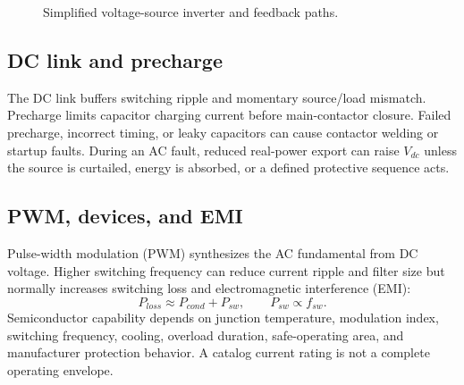 \documentclass[11pt]{article}
\begin{document}
\begin{figure}[h]
\centering
{}
\caption{Simplified voltage-source inverter and feedback paths.}
\end{figure}

\subsection{DC link and precharge}
The DC link buffers switching ripple and momentary source/load mismatch.
Precharge limits capacitor charging current before main-contactor closure.
Failed precharge, incorrect timing, or leaky capacitors can cause contactor
welding or startup faults. During an AC fault, reduced real-power export can
raise $V_{dc}$ unless the source is curtailed, energy is absorbed, or a defined
protective sequence acts.

\subsection{PWM, devices, and EMI}
Pulse-width modulation (PWM) synthesizes the AC fundamental from DC voltage.
Higher switching frequency can reduce current ripple and filter size but
normally increases switching loss and electromagnetic interference (EMI):
\[
P_{loss}\approx P_{cond}+P_{sw},\qquad P_{sw}\propto f_{sw}.
\]
Semiconductor capability depends on junction temperature, modulation index,
switching frequency, cooling, overload duration, safe-operating area, and
manufacturer protection behavior. A catalog current rating is not a complete
operating envelope.
\end{document}
